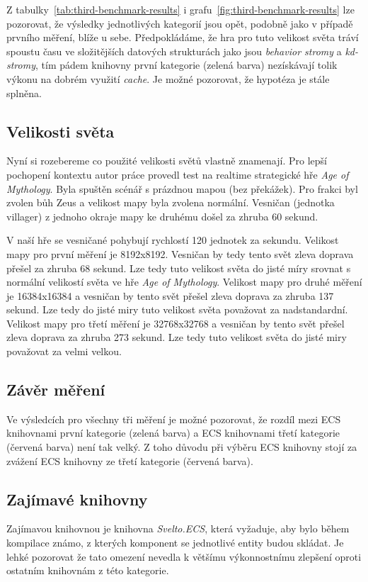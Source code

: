 Z tabulky~\ref{tab:third-benchmark-results} i grafu~\ref{fig:third-benchmark-results} lze pozorovat, že výsledky jednotlivých kategorií jsou opět, podobně jako v případě prvního měření, blíže u sebe. Předpokládáme, že hra pro tuto velikost světa tráví spoustu času ve složitějších datových strukturách jako jsou \textit{behavior stromy} a \textit{kd-stromy}, tím pádem knihovny první kategorie (zelená barva) nezískávají tolik výkonu na dobrém využití \textit{cache}. Je možné pozorovat, že hypotéza je stále splněna.

\subsection{Velikosti světa}
Nyní si rozebereme co použité velikosti světů vlastně znamenají. Pro lepší pochopení kontextu autor práce provedl test na realtime strategické hře \textit{Age of Mythology}. Byla spuštěn scénář s prázdnou mapou (bez překážek). Pro frakci byl zvolen bůh Zeus a velikost mapy byla zvolena normální. Vesničan (jednotka villager) z jednoho okraje mapy ke druhému došel za zhruba 60 sekund.

V naší hře se vesničané pohybují rychlostí 120 jednotek za sekundu. Velikost mapy pro první měření je 8192x8192. Vesničan by tedy tento svět zleva doprava přešel za zhruba 68 sekund. Lze tedy tuto velikost světa do jisté míry srovnat s normální velikostí světa ve hře \textit{Age of Mythology}. Velikost mapy pro druhé měření je 16384x16384 a vesničan by tento svět přešel zleva doprava za zhruba 137 sekund. Lze tedy do jisté miry tuto velikost světa považovat za nadstandardní. Velikost mapy pro třetí měření je 32768x32768 a vesničan by tento svět přešel zleva doprava za zhruba 273 sekund. Lze tedy tuto velikost světa do jisté miry považovat za velmi velkou.

\subsection{Závěr měření}
Ve výsledcích pro všechny tři měření je možné pozorovat, že rozdíl mezi ECS knihovnami první kategorie (zelená barva) a ECS knihovnami třetí kategorie (červená barva) není tak velký. Z toho důvodu při výběru ECS knihovny stojí za zvážení ECS knihovny ze třetí kategorie (červená barva).

\subsection{Zajímavé knihovny}
Zajímavou knihovnou je knihovna \textit{Svelto.ECS}, která vyžaduje, aby bylo během kompilace známo, z kterých komponent se jednotlivé entity budou skládat. Je lehké pozorovat že tato omezení nevedla k většímu výkonnostnímu zlepšení oproti ostatním knihovnám z této kategorie.

